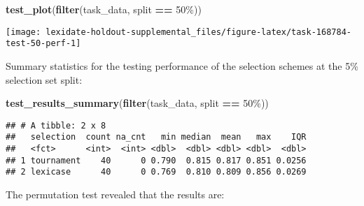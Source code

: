 \documentclass[
]{book}
\newenvironment{Shaded}{\begin{snugshade}}{\end{snugshade}}
\newcommand{\AttributeTok}[1]{\textcolor[rgb]{0.13,0.29,0.53}{#1}}
\newcommand{\DecValTok}[1]{\textcolor[rgb]{0.00,0.00,0.81}{#1}}
\newcommand{\FunctionTok}[1]{\textcolor[rgb]{0.13,0.29,0.53}{\textbf{#1}}}
\newcommand{\NormalTok}[1]{#1}
\newcommand{\OtherTok}[1]{\textcolor[rgb]{0.56,0.35,0.01}{#1}}
\newcommand{\SpecialCharTok}[1]{\textcolor[rgb]{0.81,0.36,0.00}{\textbf{#1}}}
\newcommand{\StringTok}[1]{\textcolor[rgb]{0.31,0.60,0.02}{#1}}
\begin{document}
\begin{Shaded}
\begin{Highlighting}[]
\FunctionTok{test\_plot}\NormalTok{(}\FunctionTok{filter}\NormalTok{(task\_data, split }\SpecialCharTok{==} \StringTok{\textquotesingle{}50\%\textquotesingle{}}\NormalTok{))}
\end{Highlighting}
\end{Shaded}

\texttt{[image: lexidate-holdout-supplemental\_files/figure-latex/task-168784-test-50-perf-1]}

Summary statistics for the testing performance of the selection schemes at the 5\% selection set split:

\begin{Shaded}
\begin{Highlighting}[]
\FunctionTok{test\_results\_summary}\NormalTok{(}\FunctionTok{filter}\NormalTok{(task\_data, split }\SpecialCharTok{==} \StringTok{\textquotesingle{}50\%\textquotesingle{}}\NormalTok{))}
\end{Highlighting}
\end{Shaded}

\begin{verbatim}
## # A tibble: 2 x 8
##   selection  count na_cnt   min median  mean   max    IQR
##   <fct>      <int>  <int> <dbl>  <dbl> <dbl> <dbl>  <dbl>
## 1 tournament    40      0 0.790  0.815 0.817 0.851 0.0256
## 2 lexicase      40      0 0.769  0.810 0.809 0.856 0.0269
\end{verbatim}

The permutation test revealed that the results are:

\begin{Shaded}
\end{Shaded}
\end{document}
